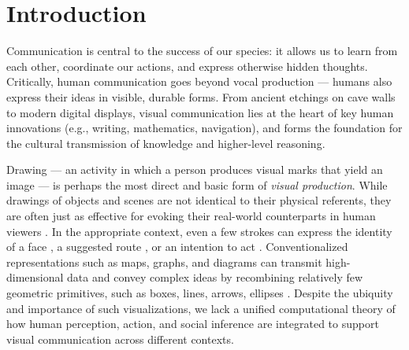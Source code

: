 \documentclass[manuscript]{stjour}
\begin{document}

\section*{Introduction}

Communication is central to the success of our species: it allows us to learn from each other, coordinate our actions, and express otherwise hidden thoughts. Critically, human communication goes beyond vocal production --- humans also express their ideas in visible, durable forms. From ancient etchings on cave walls to modern digital displays, visual communication lies at the heart of key human innovations (e.g., writing, mathematics, navigation), and forms the foundation for the cultural transmission of knowledge and higher-level reasoning. 

Drawing --- an activity in which a person produces visual marks that yield an image  --- is perhaps the most direct and basic form of \textit{visual production}. While drawings of objects and scenes are not identical to their physical referents, they are often just as effective for evoking their real-world counterparts in human viewers \cite[]{biederman1988surface,walther2011simple}. In the appropriate context, even a few strokes can express the identity of a face \cite[]{bergmann2013impact}, a suggested route \cite[]{agrawala2001rendering}, or an intention to act \cite[]{Galantucci:2005uh}. Conventionalized representations such as maps, graphs, and diagrams can transmit high-dimensional data and convey complex ideas by recombining relatively few geometric primitives, such as boxes, lines, arrows, ellipses \cite[]{tversky2000lines}. Despite the ubiquity and importance of such visualizations, we lack a unified computational theory of how human perception, action, and social inference are integrated to support visual communication across different contexts.
\end{document}
